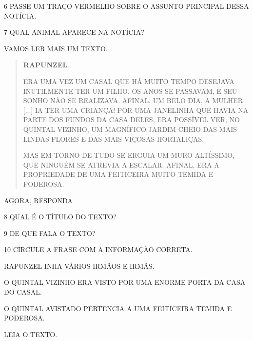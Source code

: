 \num{6} PASSE UM TRAÇO VERMELHO SOBRE O ASSUNTO PRINCIPAL DESSA NOTÍCIA.

\num{7} QUAL ANIMAL APARECE NA NOTÍCIA?


\pagebreak

VAMOS LER MAIS UM TEXTO.

\begin{quote}
\textbf{RAPUNZEL}

ERA UMA VEZ UM CASAL QUE HÁ MUITO TEMPO DESEJAVA INUTILMENTE TER UM
FILHO. OS ANOS SE PASSAVAM, E SEU SONHO NÃO SE REALIZAVA. AFINAL, UM
BELO DIA, A MULHER [...] IA TER UMA
CRIANÇA! POR UMA JANELINHA QUE HAVIA NA PARTE DOS FUNDOS DA CASA DELES,
ERA POSSÍVEL VER, NO QUINTAL VIZINHO, UM MAGNÍFICO JARDIM CHEIO DAS MAIS
LINDAS FLORES E DAS MAIS VIÇOSAS HORTALIÇAS.

MAS EM TORNO DE TUDO SE ERGUIA UM MURO ALTÍSSIMO, QUE NINGUÉM SE ATREVIA
A ESCALAR. AFINAL, ERA A PROPRIEDADE DE UMA FEITICEIRA MUITO TEMIDA E
PODEROSA.

\end{quote}

AGORA, RESPONDA

\num{8} QUAL É O TÍTULO DO TEXTO?


\num{9} DE QUE FALA O TEXTO?


\num{10} CIRCULE A FRASE COM A INFORMAÇÃO CORRETA.

RAPUNZEL INHA VÁRIOS IRMÃOS E IRMÃS.

O QUINTAL VIZINHO ERA VISTO POR UMA ENORME PORTA DA CASA DO CASAL.

O QUINTAL AVISTADO PERTENCIA A UMA FEITICEIRA TEMIDA E PODEROSA.


\pagebreak

LEIA O TEXTO.

